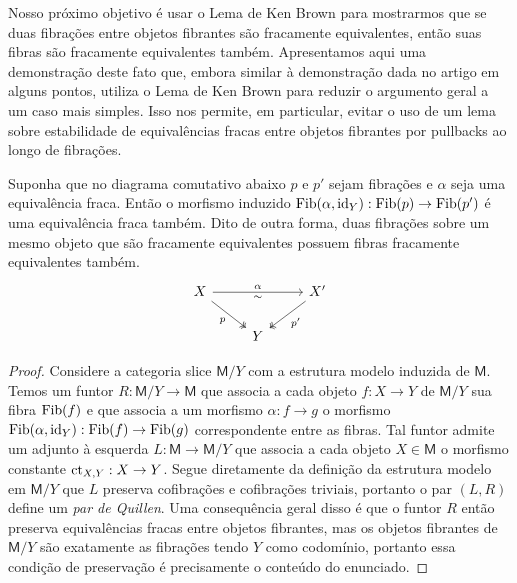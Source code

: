 Nosso próximo objetivo é usar o Lema de Ken Brown para mostrarmos que se duas fibrações entre objetos fibrantes são fracamente equivalentes, então suas fibras são fracamente equivalentes também.
Apresentamos aqui uma demonstração deste fato que, embora similar à demonstração dada no artigo em alguns pontos, utiliza o Lema de Ken Brown para reduzir o argumento geral a um caso mais simples.
Isso nos permite, em particular, evitar o uso de um lema sobre estabilidade de equivalências fracas entre objetos fibrantes por pullbacks ao longo de fibrações.

\begin{lema}\label{lema:equivalencia_fibras_1}
  Suponha que no diagrama comutativo abaixo $p$ e $p'$ sejam fibrações e $\alpha$ seja uma equivalência fraca.
  Então o morfismo induzido $\mathrm{Fib}(\alpha,\mathrm{id}_{Y}): \mathrm{Fib}(p) \to \mathrm{Fib}(p')$ é uma equivalência fraca também.
  Dito de outra forma, duas fibrações sobre um mesmo objeto que são fracamente equivalentes possuem fibras fracamente equivalentes também.
  \begin{displaymath}
    \begin{tikzcd}
      X
      \arrow[rd, two heads, "p" swap]
      \arrow[rr, "\alpha", "\sim" {swap}]
      & & X'
      \arrow[ld, two heads, "p'"]
      \\ & Y
    \end{tikzcd}
  \end{displaymath}
\end{lema}

\begin{proof}
  Considere a categoria slice $\mathsf{M}/Y$ com a estrutura modelo induzida de $\mathsf{M}$.
  Temos um funtor $R: \mathsf{M}/Y \to \mathsf{M}$ que associa a cada objeto $f: X \to Y$ de $\mathsf{M}/Y$ sua fibra $\mathrm{Fib}(f)$ e que associa a um morfismo $\alpha: f \to g$ o morfismo $\mathrm{Fib}(\alpha,\mathrm{id}_{Y}): \mathrm{Fib}(f) \to \mathrm{Fib}(g)$ correspondente entre as fibras.
  Tal funtor admite um adjunto à esquerda $L: \mathsf{M} \to \mathsf{M}/Y$ que associa a cada objeto $X \in \mathsf{M}$ o morfismo constante $\mathrm{ct}_{X,Y}: X \to Y$.
  Segue diretamente da definição da estrutura modelo em $\mathsf{M}/Y$ que $L$ preserva cofibrações e cofibrações triviais, portanto o par $(L,R)$ define um \emph{par de Quillen}.
  Uma consequência geral disso é que o funtor $R$ então preserva equivalências fracas entre objetos fibrantes, mas os objetos fibrantes de $\mathsf{M}/Y$ são exatamente as fibrações tendo $Y$ como codomínio, portanto essa condição de preservação é precisamente o conteúdo do enunciado.
\end{proof}

